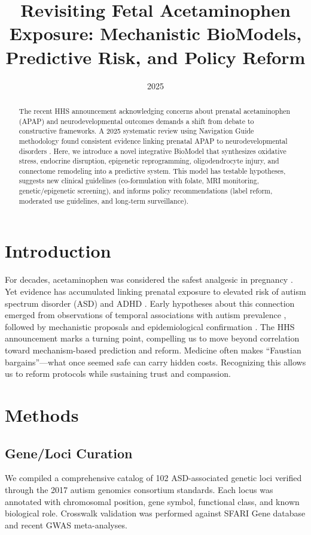 \documentclass[12pt]{article}
\title{Revisiting Fetal Acetaminophen Exposure: Mechanistic BioModels, Predictive Risk, and Policy Reform}
\author{}
\date{2025}
\begin{document}
\maketitle

\begin{abstract}
The recent HHS announcement acknowledging concerns about prenatal acetaminophen (APAP) and neurodevelopmental outcomes demands a shift from debate to constructive frameworks. A 2025 systematic review using Navigation Guide methodology found consistent evidence linking prenatal APAP to neurodevelopmental disorders \citep{navarro2025}. Here, we introduce a novel integrative BioModel that synthesizes oxidative stress, endocrine disruption, epigenetic reprogramming, oligodendrocyte injury, and connectome remodeling into a predictive system. This model has testable hypotheses, suggests new clinical guidelines (co-formulation with folate, MRI monitoring, genetic/epigenetic screening), and informs policy recommendations (label reform, moderated use guidelines, and long-term surveillance).
\end{abstract}

\section{Introduction}
For decades, acetaminophen was considered the safest analgesic in pregnancy \citep{kristensen2016}. Yet evidence has accumulated linking prenatal exposure to elevated risk of autism spectrum disorder (ASD) and ADHD \citep{masarwa2018,chen2023}. Early hypotheses about this connection emerged from observations of temporal associations with autism prevalence \citep{schultz2008,torres2003,shaw2013}, followed by mechanistic proposals \citep{parker2020} and epidemiological confirmation \citep{liew2016,avella2016}. The HHS announcement marks a turning point, compelling us to move beyond correlation toward mechanism-based prediction and reform. Medicine often makes ``Faustian bargains''---what once seemed safe can carry hidden costs. Recognizing this allows us to reform protocols while sustaining trust and compassion.

\section{Methods}

\subsection{Gene/Loci Curation}
We compiled a comprehensive catalog of 102 ASD-associated genetic loci verified through the 2017 autism genomics consortium standards. Each locus was annotated with chromosomal position, gene symbol, functional class, and known biological role. Crosswalk validation was performed against SFARI Gene database and recent GWAS meta-analyses.
\end{document}
